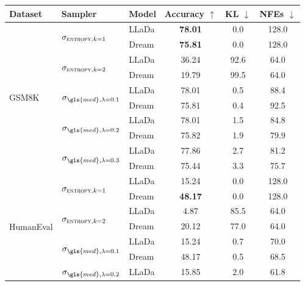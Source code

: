 \begin{table}[h]
    \centering
    \begin{tabular}{lllccc}
    \toprule
       \textbf{Dataset} & \textbf{Sampler} & \textbf{Model} 
       & \textbf{Accuracy $\uparrow$} & \textbf{KL $\downarrow$} & \textbf{NFEs $\downarrow$} \\
    \midrule
       \multirow{10}{*}{GSM8K} 
         & \multirow{2}{*}{$\sigma_{\textsc{entropy}, k=1}$} 
            & LLaDa & \textbf{78.01} & 0.0 & 128.0 \\
         & & Dream & \textbf{75.81} & 0.0 & 128.0 \\
       \cmidrule(lr){2-6}
         & \multirow{2}{*}{$\sigma_{\textsc{entropy}, k=2}$} 
            & LLaDa & 36.24 & 92.6 & 64.0 \\
         & & Dream & 19.79 & 99.5 & 64.0 \\
       \cmidrule(lr){2-6}
         & \multirow{2}{*}{$\sigma_{\gls{med}, \lambda = 0.1}$}
            & LLaDa & 78.01 & 0.5 & 88.4 \\
         & & Dream & 75.81 & 0.4 & 92.5 \\
       \cmidrule(lr){2-6}
         & \multirow{2}{*}{$\sigma_{\gls{med}, \lambda = 0.2}$}
            & LLaDa & 78.01 & 1.5 & 84.8 \\
         & & Dream & 75.82 & 1.9 & 79.9 \\
       \cmidrule(lr){2-6}
         & \multirow{2}{*}{$\sigma_{\gls{med}, \lambda = 0.3}$}
            & LLaDa & 77.86 & 2.7 & 81.2 \\
         & & Dream & 75.44 & 3.3 & 75.7 \\
    \midrule
       \multirow{10}{*}{HumanEval} 
         & \multirow{2}{*}{$\sigma_{\textsc{entropy}, k=1}$} 
            & LLaDa & 15.24  & 0.0 & 128.0 \\
         & & Dream & \textbf{48.17} & 0.0 & 128.0 \\
       \cmidrule(lr){2-6}
         & \multirow{2}{*}{$\sigma_{\textsc{entropy}, k=2}$} 
            & LLaDa & 4.87 & 85.5 & 64.0 \\
         & & Dream & 20.12 & 77.0 & 64.0 \\
       \cmidrule(lr){2-6}
         & \multirow{2}{*}{$\sigma_{\gls{med}, \lambda = 0.1}$}
            & LLaDa & 15.24 & 0.7 & 70.0 \\
         & & Dream & 48.17 & 0.5 & 68.5 \\
       \cmidrule(lr){2-6}
         & \multirow{2}{*}{$\sigma_{\gls{med}, \lambda = 0.2}$}
            & LLaDa & 15.85 & 2.0 & 61.8 \\

\end{tabular}
\end{table}
